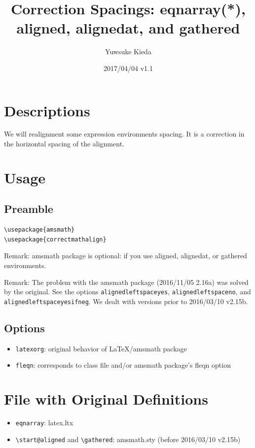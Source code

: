\documentclass{article}
\title{Correction Spacings: eqnarray(*), aligned, alignedat, and gathered}
\author{Yuwsuke Kieda}
\date{2017/04/04 v1.1}
\begin{document}
\maketitle

\section{Descriptions}

We will realignment some expression environments spacing.
It is a correction in the horizontal spacing of the alignment.

\section{Usage}

\subsection{Preamble}

\begin{verbatim}
\usepackage{amsmath}
\usepackage{correctmathalign}
\end{verbatim}

Remark: amsmath package is optional: if you use aligned, alignedat, or gathered environments.

Remark: The problem with the amsmath package (2016/11/05 2.16a) was solved by the original. See the options \texttt{alignedleftspaceyes}, \texttt{alignedleftspaceno}, and \texttt{alignedleftspaceyesifneg}.
We dealt with versions prior to 2016/03/10 v2.15b.

\subsection{Options}

\begin{itemize}
 \item \verb!latexorg!: original behavior of LaTeX/amsmath package
 \item \verb!fleqn!: corresponds to class file and/or amsmath package's fleqn option
\end{itemize}

\section{File with Original Definitions}

\begin{itemize}
 \item \verb!eqnarray!: latex.ltx
 \item \verb!\start@aligned! and \verb!\gathered!: amsmath.sty (before 2016/03/10 v2.15b)
\end{itemize}
\end{document}
